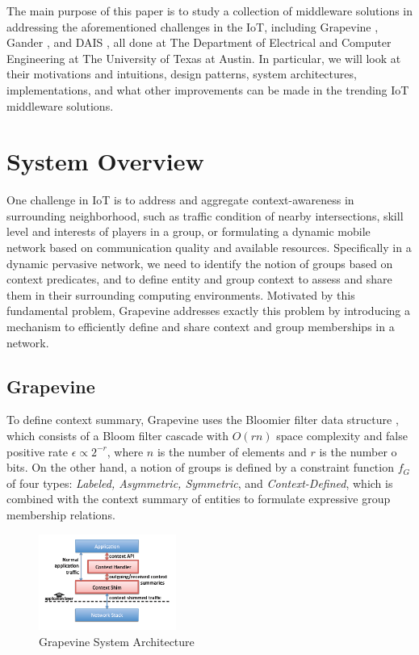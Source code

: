 \documentclass[11pt,onecolumn]{article}
\begin{document}
The main purpose of this paper is to study a collection of middleware solutions in addressing the aforementioned challenges in the IoT, including Grapevine \cite{grapevine}, Gander \cite{michel2013gander}, and DAIS \cite{dais}, all done at The Department of Electrical and Computer Engineering at The University of Texas at Austin. In particular, we will look at their motivations and intuitions, design patterns, system architectures, implementations, and what other improvements can be made in the trending IoT middleware solutions.

\section{System Overview}
One challenge in IoT is to address and aggregate context-awareness in surrounding neighborhood, such as traffic condition of nearby intersections, skill level and interests of players in a group, or formulating a dynamic mobile network based on communication quality and available resources. Specifically in a dynamic pervasive network, we need to identify the notion of groups based on context predicates, and to define entity and group context to assess and share them in their surrounding computing environments.  Motivated by this fundamental problem, Grapevine \cite{grapevine} addresses exactly this problem by introducing a mechanism to efficiently define and share context and group memberships in a network.

\subsection{Grapevine}

To define context summary, Grapevine uses the Bloomier filter data structure \cite{chazelle2004bloomier}, which consists of a Bloom filter cascade with $O(rn)$ space complexity and false positive rate $\epsilon \propto 2^{-r}$, where $n$ is the number of elements and $r$ is the number o bits. On the other hand, a notion of groups is defined by a constraint function $f_G$ of four types: {\em Labeled, Asymmetric, Symmetric}, and {\em Context-Defined}, which is combined with the context summary of entities to formulate expressive group membership relations.

\begin{figure}
\vspace{-20pt}
  \begin{center}
    \includegraphics[width=0.4\textwidth]{resources/grapevine_architecture.png}
  \end{center}
\vspace{-20pt}
  \caption{Grapevine System Architecture \cite{grapevine} \label{grapevine_architecture}}
\end{figure}
\end{document}
